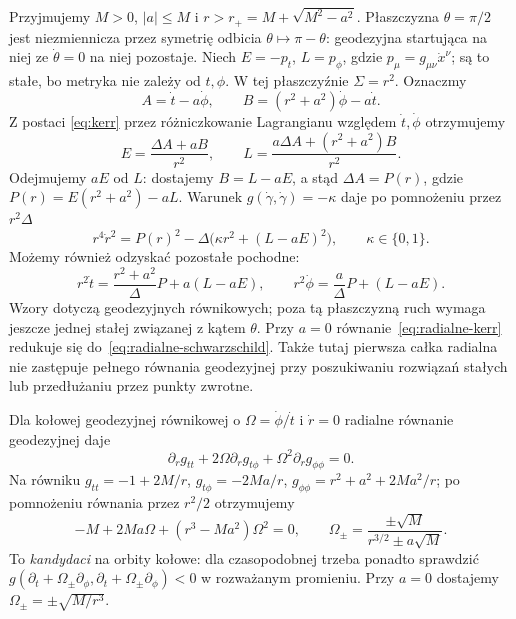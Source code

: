 \begin{przyklad}
\label{prz:geodezyjne-kerr}
Przyjmujemy $M>0$, $|a|\leq M$ i $r>r_+=M+\sqrt{M^2-a^2}$.
Płaszczyzna $\theta=\pi/2$ jest niezmiennicza
przez symetrię odbicia $\theta\mapsto\pi-\theta$:
geodezyjna startująca na niej ze
$\dot\theta=0$ na niej pozostaje.
Niech $E=-p_t$, $L=p_\phi$, gdzie
$p_\mu=g_{\mu\nu}\dot x^\nu$; są to stałe,
bo metryka nie zależy od $t,\phi$.
W tej płaszczyźnie $\Sigma=r^2$. Oznaczmy
\[
 A=\dot t-a\dot\phi,
 \qquad B=(r^2+a^2)\dot\phi-a\dot t.
\]
Z postaci \eqref{eq:kerr} przez różniczkowanie
Lagrangianu względem $\dot t,\dot\phi$
otrzymujemy
\[
 E=\frac{\Delta A+aB}{r^2},
 \qquad
 L=\frac{a\Delta A+(r^2+a^2)B}{r^2}.
\]
Odejmujemy $aE$ od $L$: dostajemy
$B=L-aE$, a stąd $\Delta A=P(r)$,
gdzie $P(r)=E(r^2+a^2)-aL$.
Warunek $g(\dot\gamma,\dot\gamma)=-\kappa$
daje po pomnożeniu przez $r^2\Delta$
\begin{equation}\label{eq:radialne-kerr}
 r^4\dot r^2=P(r)^2
        -\Delta\bigl(\kappa r^2+(L-aE)^2\bigr),
 \qquad \kappa\in\{0,1\}.
\end{equation}
Możemy również odzyskać pozostałe pochodne:
\begin{equation}\label{eq:tphi-kerr}
 r^2\dot t=\frac{r^2+a^2}{\Delta}P+a(L-aE),
 \qquad
 r^2\dot\phi=\frac a\Delta P+(L-aE).
\end{equation}
Wzory dotyczą geodezyjnych równikowych;
poza tą płaszczyzną ruch wymaga jeszcze
jednej stałej związanej z kątem $\theta$.
Przy $a=0$ równanie~\eqref{eq:radialne-kerr}
redukuje się do~\eqref{eq:radialne-schwarzschild}.
Także tutaj pierwsza całka radialna nie zastępuje pełnego
równania geodezyjnej przy poszukiwaniu rozwiązań stałych
lub przedłużaniu przez punkty zwrotne.

Dla kołowej geodezyjnej równikowej o
$\Omega=\dot\phi/\dot t$ i $\dot r=0$
radialne równanie geodezyjnej daje
\[
 \partial_rg_{tt}+2\Omega\partial_rg_{t\phi}
                 +\Omega^2\partial_rg_{\phi\phi}=0.
\]
Na równiku
$g_{tt}=-1+2M/r$,
$g_{t\phi}=-2Ma/r$,
$g_{\phi\phi}=r^2+a^2+2Ma^2/r$;
po pomnożeniu równania przez $r^2/2$
otrzymujemy
\[
 -M+2Ma\Omega+(r^3-Ma^2)\Omega^2=0,
 \qquad
 \Omega_\pm=\frac{\pm\sqrt M}{r^{3/2}\pm a\sqrt M}.
\]
To \emph{kandydaci} na orbity kołowe: dla
czasopodobnej trzeba ponadto sprawdzić
$g(\partial_t+\Omega_\pm\partial_\phi,
   \partial_t+\Omega_\pm\partial_\phi)<0$
w rozważanym promieniu. Przy $a=0$
dostajemy $\Omega_\pm=\pm\sqrt{M/r^3}$.
\end{przyklad}

